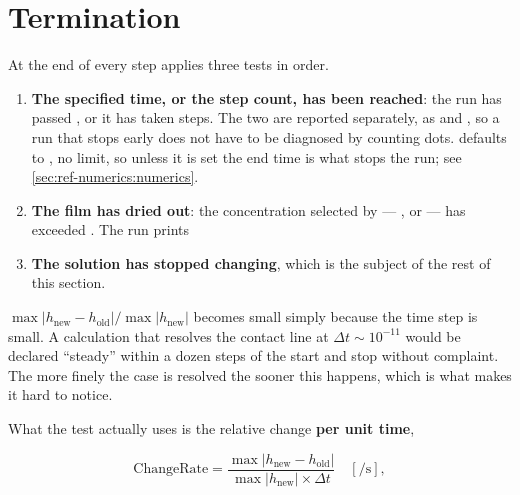 \section{Termination}
\label{sec:convergence:termination}

At the end of every step  applies three tests in
order.

\begin{enumerate}
  \item \textbf{The specified time, or the step count, has been reached}: the
    run has passed , or it has taken
     steps. The two are reported separately, as
     and
    , so a run that stops early
    does not have to be diagnosed by counting dots.  defaults to
    , no limit, so unless it is set the end time is what stops the
    run; see \cref{sec:ref-numerics:numerics}.
  \item \textbf{The film has dried out}: the concentration selected by
     --- ,  or
     --- has exceeded . The run
    prints 
  \item \textbf{The solution has stopped changing}, which is the subject of the
    rest of this section.
\end{enumerate}

\begin{warn}
  $\max\lvert h_{\mathrm{new}} - h_{\mathrm{old}}\rvert /
   \max\lvert h_{\mathrm{new}}\rvert$ becomes small simply because the time
  step is small. A calculation that resolves the contact line at
  $\Delta t \sim 10^{-11}$ would be declared ``steady'' within a dozen steps of
  the start and stop without complaint. The more finely the case is resolved
  the sooner this happens, which is what makes it hard to notice.
\end{warn}

What the test actually uses is the relative change \textbf{per unit time},

\begin{equation}\label{eq:changerate}
  \mathrm{ChangeRate} =
    \frac{\max\lvert h_{\mathrm{new}} - h_{\mathrm{old}}\rvert}
         {\max\lvert h_{\mathrm{new}}\rvert \times \Delta t}
  \quad [\si{\per\second}],
\end{equation}

